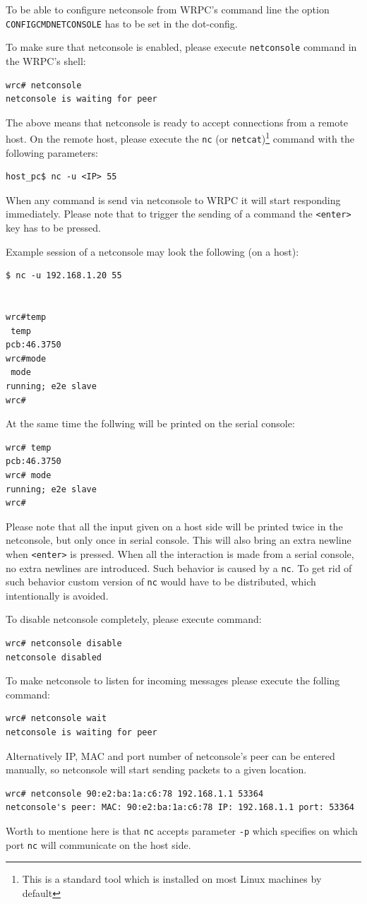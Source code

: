 \documentclass[a4paper, 12pt]{article}
\renewcommand{\_}{\underscore\allowbreak}
\begin{document}
To be able to configure netconsole from WRPC's command line the option
\texttt{CONFIG\_CMD\_NETCONSOLE} has to be set in the dot-config.

To make sure that netconsole is enabled, please execute \texttt{netconsole}
command in the WRPC's shell:
\begin{lstlisting}
wrc# netconsole
netconsole is waiting for peer
\end{lstlisting}
The above means that netconsole is ready to accept connections from a remote
host. On the remote host, please execute the \texttt{nc}
(or \texttt{netcat})\footnote{This is a standard tool which is installed on
most Linux machines by default} command with the following parameters:
\begin{lstlisting}
host_pc$ nc -u <IP> 55
\end{lstlisting}
When any command is send via netconsole to WRPC it will start responding
immediately. Please note that to trigger the sending of a command the
\texttt{<enter>} key has to be pressed.

Example session of a netconsole may look the following (on a host):
\begin{lstlisting}
$ nc -u 192.168.1.20 55


wrc#temp
 temp
pcb:46.3750
wrc#mode
 mode
running; e2e slave
wrc#
\end{lstlisting}
At the same time the follwing will be printed on the serial console:
\begin{lstlisting}
wrc# temp
pcb:46.3750
wrc# mode
running; e2e slave
wrc#
\end{lstlisting}

Please note that all the input given on a host side will be printed twice in
the netconsole, but only once in serial console. This will also bring an extra
newline when \texttt{<enter>} is pressed. When all the interaction is made from
a serial console, no extra newlines are introduced.
Such behavior is caused by a \texttt{nc}. To get rid of such behavior custom
version of \texttt{nc} would have to be distributed, which intentionally is
avoided.

To disable netconsole completely, please execute command:
\begin{lstlisting}
wrc# netconsole disable
netconsole disabled
\end{lstlisting}
To make netconsole to listen for incoming messages please execute the folling
command:
\begin{lstlisting}
wrc# netconsole wait
netconsole is waiting for peer
\end{lstlisting}
Alternatively IP, MAC and port number of netconsole's peer can be entered
manually, so netconsole will start sending packets to a given location.
\begin{lstlisting}
wrc# netconsole 90:e2:ba:1a:c6:78 192.168.1.1 53364
netconsole's peer: MAC: 90:e2:ba:1a:c6:78 IP: 192.168.1.1 port: 53364
\end{lstlisting}
Worth to mentione here is that \texttt{nc} accepts parameter \texttt{-p}
which specifies on which port \texttt{nc} will communicate on the host side.
\end{document}
